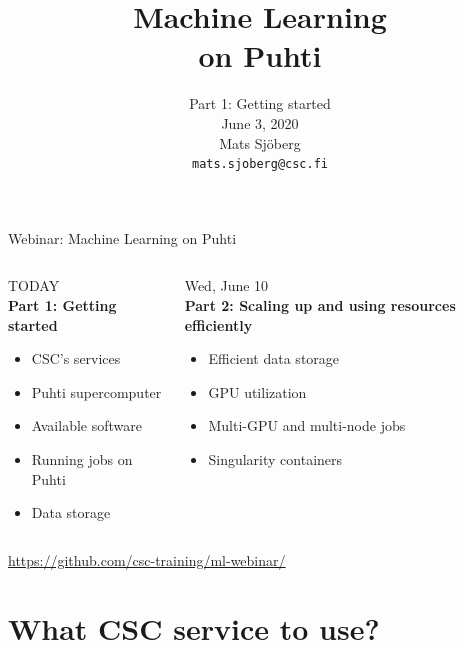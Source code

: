 \documentclass[aspectratio=1610,14pt]{beamer}
\title{Machine Learning\\on Puhti}
\subtitle{Part 1: Getting started\\[5mm]
  June 3, 2020\\
  Mats Sjöberg\\
  {\tt\small mats.sjoberg@csc.fi}}
\newcommand{\link}[1]{\alert{\url{#1}}}
\begin{document}
\begin{frame}{Webinar: Machine Learning on Puhti}
  \begin{columns}[t]
    \begin{column}{0.45\linewidth}
      \vfill
      \hspace{15mm} \alert{TODAY} \\[5mm]

      \textbf{Part 1: Getting started}
      
      \begin{itemize}
      \item CSC's services
      \item Puhti supercomputer
      \item Available software
      \item Running jobs on Puhti
      \item Data storage
      \end{itemize}
    \end{column}
    \begin{column}{0.55\linewidth}
      \vfill
      \hspace{12mm} \alert{Wed, June 10} \\[5mm]
      
      \textbf{Part 2: Scaling up and using resources efficiently}
      
      \begin{itemize}
      \item Efficient data storage
      \item GPU utilization
      \item Multi-GPU and multi-node jobs
      \item Singularity containers
      \end{itemize}
    \end{column}
  \end{columns}
  \vspace{10mm}
  \link{https://github.com/csc-training/ml-webinar/}
\end{frame}

\section{What CSC service to use?}

\end{document}
